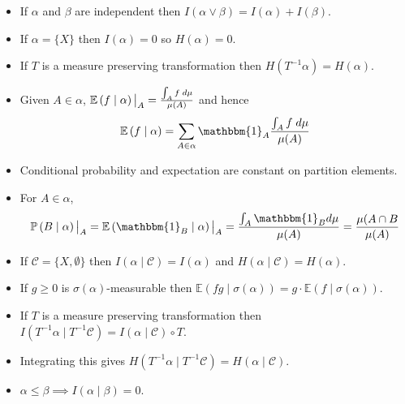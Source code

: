 \documentclass[11pt]{article}
\newcommand{\indic}[1]{\mathbbm{1}_{#1}}
\newcommand\restr[2]{{%
  \left.\kern-\nulldelimiterspace %
  #1 %
  \vphantom{\big|} %
  \right|_{#2} %
  }}
\newcommand{\gvn}[2]{\ensuremath{\left(#1\;|\;#2\right)}}
\newcommand{\expg}[2]{\ensuremath{\mathbb{E}\gvn{#1}{#2}}}
\newcommand{\infog}[2]{\ensuremath{I\gvn{#1}{#2}}}
\newcommand{\entrg}[2]{\ensuremath{H\gvn{#1}{#2}}}
\newcommand{\probg}[2]{\ensuremath{\mathbb{P}\gvn{#1}{#2}}}
\begin{document}
\begin{itemize}
	\item If $\alpha$ and $\beta$ are independent then $I(\alpha\vee\beta)=I(\alpha)+I(\beta)$.
	\item If $\alpha=\{X\}$ then $I(\alpha)=0$ so $H(\alpha)=0$.
	\item If $T$ is a measure preserving transformation then $H(T^{-1}\alpha)=H(\alpha)$.
	\item Given $A\in\alpha$, $\restr{\expg{f}{\alpha}}{A}=\frac{\int_A f \;d\mu}{\mu(A)}$ and hence
		$$\expg{f}{\alpha}=\sum_{A\in\alpha}\indic{A}\frac{\int_A f \;d\mu}{\mu(A)}$$
	\item Conditional probability and expectation are constant on partition elements.
	\item For $A\in\alpha$, 
		$$\restr{\probg{B}{\alpha}}{A}=\restr{\expg{\indic{B}}{\alpha}}{A}=\frac{\int_A \indic{B} d\mu}{\mu(A)}=\frac{\mu(A\cap B}{\mu(A)}$$
	\item If $\mathcal{C}=\{X,\emptyset\}$ then $\infog{\alpha}{\mathcal{C}}=I(\alpha)$ and $\entrg{\alpha}{\mathcal{C}}=H(\alpha)$.
	\item If $g\geq 0$ is $\sigma(\alpha)$-measurable then $\expg{fg}{\sigma(\alpha)}=g\cdot\expg{f}{\sigma(\alpha)}$.
	\item If $T$ is a measure preserving transformation then $\infog{T^{-1}\alpha}{T^{-1}\mathcal{C}}=\infog{\alpha}{\mathcal{C}}\circ T$.
	\item Integrating this gives $\entrg{T^{-1}\alpha}{T^{-1}\mathcal{C}}=\entrg{\alpha}{\mathcal{C}}$.
	\item $\alpha\leq\beta\implies\infog{\alpha}{\beta}=0$.
\end{itemize}
\end{document}

